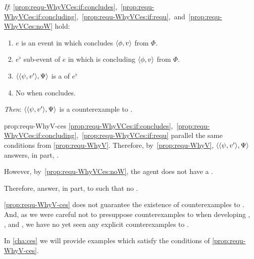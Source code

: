 \begin{note}
\begin{proposition}
    \begin{itenum}
    \item[\emph{If}:]
      \ref{prop:requ-WhyVCes:if:concludes},~\ref{prop:requ-WhyVCes:if:concluding},~\ref{prop:requ-WhyVCes:if:requ},~and~\ref{prop:requ-WhyVCes:noW} hold:
      \begin{enumerate}[label=\arabic*., ref=(\arabic*), series=propRequWhyVSeries]
      \item
        \label{prop:requ-WhyVCes:if:concludes}
        \(e\) is an event in which \vAgent{} concludes \(\langle \phi, v \rangle\) from \(\Phi\).
      \item
        \label{prop:requ-WhyVCes:if:concluding}
        \(e^{\flat}\) sub-event of \(e\) in which \vAgent{} is concluding \(\langle \phi, v \rangle\) from \(\Phi\).
      \item
        \label{prop:requ-WhyVCes:if:requ}
        \(\langle \langle \psi, v' \rangle, \Psi \rangle\) is a \requ{} of \(e^{\flat}\)
      \item
        \label{prop:requ-WhyVCes:noW}
        No \wit{} when concludes.
      \end{enumerate}
    \item[\emph{Then}:]
      \(\langle \langle \psi, v' \rangle, \Psi \rangle\) is a counterexample to \issueConstraint{}.
    \end{itenum}
    \vspace{-\baselineskip}
  \end{proposition}

  \begin{argument}{prop:requ-WhyV-ces}
    \ref{prop:requ-WhyVCes:if:concludes},~\ref{prop:requ-WhyVCes:if:concluding},~\ref{prop:requ-WhyVCes:if:requ} parallel the same conditions from \autoref{prop:requ-WhyV}.
    Therefore, by~\autoref{prop:requ-WhyV}, \(\langle \langle \psi, v' \rangle, \Psi \rangle\) answers, in part, \qWhyV{}.

    However, by~\ref{prop:requ-WhyVCes:noW}, the agent does not have a \wit{}.

    Therefore, answer, in part, to \qWhyV{} such that no \wit{}.
  \end{argument}

  \autoref{prop:requ-WhyV-ces} does not guarantee the existence of counterexamples to \issueConstraint{}.
  And, as we were careful not to presuppose counterexamples to \issueConstraint{} when developing , , and , we have no yet seen any explicit counterexamples to \issueConstraint{}.

  In \autoref{cha:ces} we will provide examples which satisfy the conditions of \autoref{prop:requ-WhyV-ces}.
\end{note}

